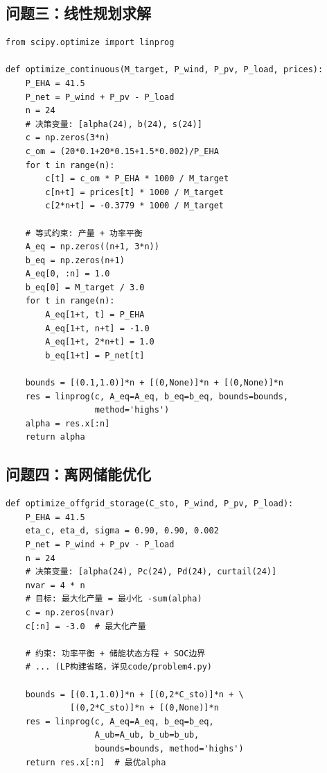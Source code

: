 \subsection{问题三：线性规划求解}

\begin{verbatim}
from scipy.optimize import linprog

def optimize_continuous(M_target, P_wind, P_pv, P_load, prices):
    P_EHA = 41.5
    P_net = P_wind + P_pv - P_load
    n = 24
    # 决策变量: [alpha(24), b(24), s(24)]
    c = np.zeros(3*n)
    c_om = (20*0.1+20*0.15+1.5*0.002)/P_EHA
    for t in range(n):
        c[t] = c_om * P_EHA * 1000 / M_target
        c[n+t] = prices[t] * 1000 / M_target
        c[2*n+t] = -0.3779 * 1000 / M_target
    
    # 等式约束: 产量 + 功率平衡
    A_eq = np.zeros((n+1, 3*n))
    b_eq = np.zeros(n+1)
    A_eq[0, :n] = 1.0
    b_eq[0] = M_target / 3.0
    for t in range(n):
        A_eq[1+t, t] = P_EHA
        A_eq[1+t, n+t] = -1.0
        A_eq[1+t, 2*n+t] = 1.0
        b_eq[1+t] = P_net[t]
    
    bounds = [(0.1,1.0)]*n + [(0,None)]*n + [(0,None)]*n
    res = linprog(c, A_eq=A_eq, b_eq=b_eq, bounds=bounds,
                  method='highs')
    alpha = res.x[:n]
    return alpha
\end{verbatim}

\subsection{问题四：离网储能优化}

\begin{verbatim}
def optimize_offgrid_storage(C_sto, P_wind, P_pv, P_load):
    P_EHA = 41.5
    eta_c, eta_d, sigma = 0.90, 0.90, 0.002
    P_net = P_wind + P_pv - P_load
    n = 24
    # 决策变量: [alpha(24), Pc(24), Pd(24), curtail(24)]
    nvar = 4 * n
    # 目标: 最大化产量 = 最小化 -sum(alpha)
    c = np.zeros(nvar)
    c[:n] = -3.0  # 最大化产量
    
    # 约束: 功率平衡 + 储能状态方程 + SOC边界
    # ... (LP构建省略，详见code/problem4.py)
    
    bounds = [(0.1,1.0)]*n + [(0,2*C_sto)]*n + \
             [(0,2*C_sto)]*n + [(0,None)]*n
    res = linprog(c, A_eq=A_eq, b_eq=b_eq,
                  A_ub=A_ub, b_ub=b_ub,
                  bounds=bounds, method='highs')
    return res.x[:n]  # 最优alpha
\end{verbatim}
